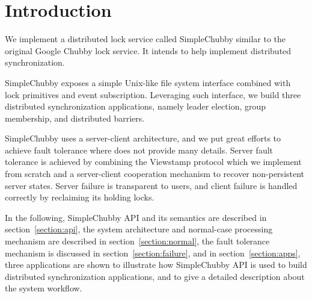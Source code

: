 \section{Introduction}

We implement a distributed lock service called SimpleChubby
similar to the original Google Chubby lock service\cite{burrows2006chubby}.
It intends to help implement distributed synchronization.

SimpleChubby exposes a simple Unix-like file system interface
combined with lock primitives and event subscription.
Leveraging such interface, we build three distributed synchronization
applications, namely leader election, group membership, and distributed barriers.

SimpleChubby uses a server-client architecture,
and we put great efforts to achieve fault tolerance
where \cite{burrows2006chubby} does not provide many details.
Server fault tolerance is achieved by combining the Viewstamp protocol \cite{oki1988viewstamped}
which we implement from scratch and a server-client cooperation mechanism
to recover non-persistent server states.
Server failure is transparent to users, and client failure
is handled correctly by reclaiming its holding locks.

In the following,
SimpleChubby API and its semantics are described in section~\ref{section:api},
the system architecture and normal-case processing mechanism
are described in section~\ref{section:normal},
the fault tolerance mechanism is discussed in section~\ref{section:failure},
and in section~\ref{section:apps},
three applications are shown to illustrate
how SimpleChubby API is used to build
distributed synchronization applications,
and to give a detailed description about the system workflow.
